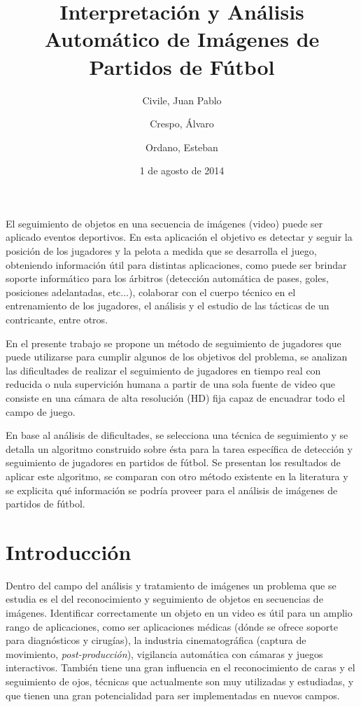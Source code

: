 \documentclass[a4paper,11pt]{report}
\title{Interpretación y Análisis Automático de Imágenes de Partidos de Fútbol}
\date{1 de agosto de 2014}
\author{Civile, Juan Pablo \and Crespo, Álvaro \and Ordano, Esteban }
\begin{document}
\pagestyle{fancy}
\maketitle

\addvspace{3em}
\begin{customabstract}
\begin{doublespace}
El seguimiento de objetos en una secuencia de imágenes (video) puede ser
aplicado eventos deportivos. En esta aplicación el objetivo es detectar y
seguir la posición de los jugadores y la pelota a medida
que se desarrolla el juego, obteniendo información útil para distintas
aplicaciones, como puede ser brindar soporte informático para los árbitros
(detección automática de pases, goles, posiciones adelantadas, etc...),
colaborar con el cuerpo técnico en el entrenamiento de los jugadores,
el análisis y el estudio de las tácticas de un contricante, entre otros.

En el presente trabajo se propone un método de seguimiento de jugadores que
puede utilizarse para cumplir algunos de los objetivos del problema, se
analizan las dificultades de realizar el seguimiento de jugadores en tiempo
real con reducida o nula supervición humana a partir de una sola fuente de
video que consiste en una cámara de alta resolución (HD) fija capaz de
encuadrar todo el campo de juego.

En base al análisis de dificultades, se selecciona una técnica de seguimiento
y se detalla un algoritmo construido sobre ésta para la tarea específica de
detección y seguimiento de jugadores en partidos de fútbol. Se presentan los
resultados de aplicar este algoritmo, se comparan con otro método existente en
la literatura y se explicita qué información se podría proveer para el análisis
de imágenes de partidos de fútbol.
\end{doublespace}
\end{customabstract}

\tableofcontents

\pagestyle{fancy}
\chapter*{Introducción}

Dentro del campo del análisis y tratamiento de imágenes un problema que se
estudia es el del reconocimiento y seguimiento de objetos en secuencias de
imágenes. Identificar correctamente un objeto en un video es útil para un
amplio rango de aplicaciones, como ser aplicaciones médicas (dónde se ofrece
soporte para diagnósticos y cirugías), la industria cinematográfica (captura de
movimiento, \textit{post-producción}), vigilancia automática con cámaras y
juegos interactivos. También tiene una gran influencia en el reconocimiento de
caras y el seguimiento de ojos, técnicas que actualmente son muy utilizadas y
estudiadas, y que tienen una gran potencialidad para ser implementadas en
nuevos campos.
\end{document}
